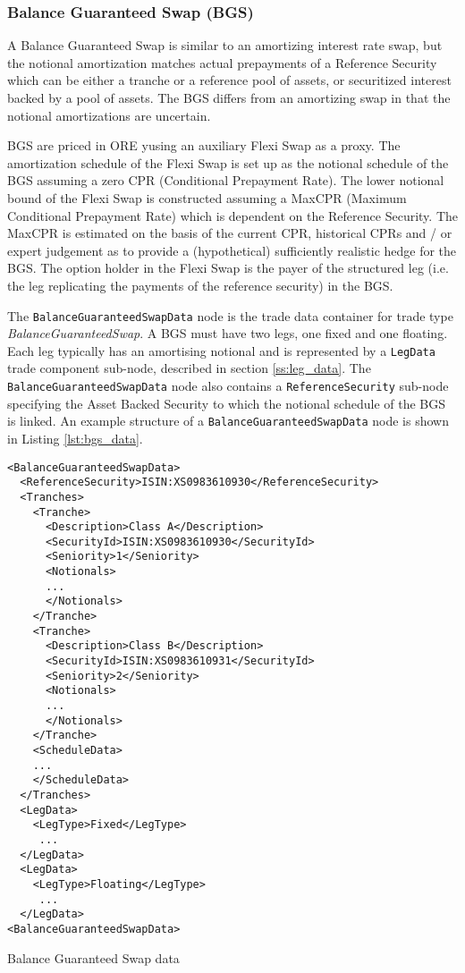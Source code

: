 \subsubsection{Balance Guaranteed Swap (BGS)}

A Balance Guaranteed Swap is similar to an amortizing interest rate swap, but the  
notional amortization matches actual prepayments of a Reference Security which can 
be either a tranche or a reference pool of assets, or securitized interest backed 
by a pool of assets. The BGS differs from an amortizing swap in that the notional 
amortizations are uncertain.

BGS are priced in ORE yusing an auxiliary Flexi Swap as a proxy. The amortization schedule 
of the Flexi Swap is set up as the notional schedule of the BGS assuming a zero 
CPR (Conditional Prepayment Rate). The lower notional bound of the Flexi Swap is 
constructed assuming a MaxCPR (Maximum Conditional Prepayment Rate) which is 
dependent on the Reference Security. The MaxCPR is estimated on the basis of 
the current CPR, historical CPRs and / or expert judgement as to provide a 
(hypothetical) sufficiently realistic hedge for the BGS. The option holder in 
the Flexi Swap is the payer of the structured leg (i.e. the leg replicating the 
payments of the reference security) in the BGS.

The \lstinline!BalanceGuaranteedSwapData! node is the trade data container for trade type \emph{BalanceGuaranteedSwap}.  A BGS must have two legs, one fixed and one floating. Each leg typically has an amortising notional and is represented by a \lstinline!LegData! trade component sub-node, described in section \ref{ss:leg_data}.
The \lstinline!BalanceGuaranteedSwapData! node also contains a \lstinline!ReferenceSecurity! sub-node specifying the Asset Backed Security to which the notional schedule of the BGS is linked. 
An example structure of a  \lstinline!BalanceGuaranteedSwapData! node is shown in Listing \ref{lst:bgs_data}.
\begin{listing}[H]
\begin{verbatim}
<BalanceGuaranteedSwapData>
  <ReferenceSecurity>ISIN:XS0983610930</ReferenceSecurity>
  <Tranches>
    <Tranche>
      <Description>Class A</Description>
      <SecurityId>ISIN:XS0983610930</SecurityId>
      <Seniority>1</Seniority>
      <Notionals>
      ...
      </Notionals>
    </Tranche>
    <Tranche>
      <Description>Class B</Description>
      <SecurityId>ISIN:XS0983610931</SecurityId>
      <Seniority>2</Seniority>
      <Notionals>
      ...
      </Notionals>
    </Tranche>
    <ScheduleData>
    ...
    </ScheduleData>
  </Tranches>
  <LegData>
	<LegType>Fixed</LegType>
	 ...
  </LegData>
  <LegData>
	<LegType>Floating</LegType>
	 ...
  </LegData>
<BalanceGuaranteedSwapData>
\end{verbatim}
\caption{Balance Guaranteed Swap data}
\label{lst:bgs_data}
\end{listing}

